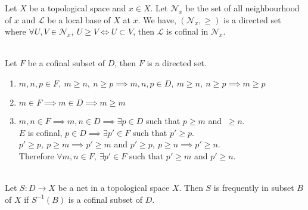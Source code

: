 \begin{remark}
	Let $X$ be a topological space and $x \in X$. Let $\mathcal{N}_x$ be the set of all neighbourhood of $x$ and $\mathcal{L}$ be a local base of $X$ at $x$. We have, $(\mathcal{N}_x,\ge)$ is a directed set where $\forall U,V \in \mathcal{N}_x,\ U \ge V \iff U \subset V$, then $\mathcal{L}$ is cofinal in $\mathcal{N}_x$.
\end{remark}

\begin{remark}\cite[10.1.8]{joshi}\\
	Let $F$ be a cofinal subset of $D$, then $F$ is a directed set.
	\begin{enumerate}
		\item $m,n,p \in F,\ m \ge n,\ n \ge p \implies m,n,p \in D,\ m \ge n,\ n \ge p \implies m \ge p$
		\item $m \in F \implies m \in D \implies m \ge m$
		\item $m,n \in F \implies m,n \in D \implies \exists p \in D$ such that $p \ge m$ and $\ \ge n$.\\

			$E$ is cofinal, $p \in D \implies \exists p' \in F$ such that $p' \ge p$.\\

			$p' \ge p,\ p \ge m \implies p' \ge m$ and $p' \ge p,\ p \ge n \implies p' \ge n$.\\

			Therefore $\forall m,n \in F,\ \exists p' \in F$ such that $p' \ge m$ and $p' \ge n$.
	\end{enumerate}
\end{remark}

\begin{definition}\cite[10.1.7]{joshi}\\
	Let $S : D \to X$ be a net in a topological space $X$. Then $S$ is frequently in subset $B$ of $X$ if $S^{-1}(B)$ is a cofinal subset of $D$.
\end{definition}


